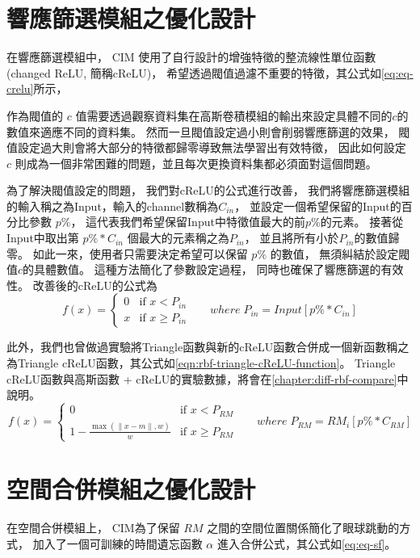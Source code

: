 \documentclass[class=NCU_thesis, crop=false]{standalone}
\begin{document}
\section{響應篩選模組之優化設計}
	在響應篩選模組中，
	CIM 使用了自行設計的增強特徵的整流線性單位函數(changed ReLU, 簡稱cReLU)，
	希望透過閥值過濾不重要的特徵，其公式如\cref{eq:eq-crelu}所示，
	
	作為閥值的 $c$ 值需要透過觀察資料集在高斯卷積模組的輸出來設定具體不同的$c$的數值來適應不同的資料集。
	然而一旦閥值設定過小則會削弱響應篩選的效果，
	閥值設定過大則會將大部分的特徵都歸零導致無法學習出有效特徵，
	因此如何設定 $c$ 則成為一個非常困難的問題，並且每次更換資料集都必須面對這個問題。

	為了解決閥值設定的問題，
	我們對cReLU的公式進行改善，
	我們將響應篩選模組的輸入稱之為Input，輸入的channel數稱為$C_{in}$，
	並設定一個希望保留的Input的百分比參數 $p\%$，
	這代表我們希望保留Input中特徵值最大的前$p\%$的元素。
	接著從Input中取出第 $p\% * C_{in}$  個最大的元素稱之為$P_{in}$，
	並且將所有小於$P_{in}$的數值歸零。
	如此一來，使用者只需要決定希望可以保留 $p\%$ 的數值，
	無須糾結於設定閥值$c$的具體數值。
	這種方法簡化了參數設定過程，
	同時也確保了響應篩選的有效性。
	改善後的cReLU的公式為\\
	\begin{equation}
	    \label{eq:eq-cReLUPercent}
	    f(x)= 
	    \begin{cases}
	        0 & \text{if  $x < P_{in}$ }\\
	        x & \text{if  $x \geq P_{in}$}
	    \end{cases} \quad where \; P_{in} = Input\left[ p\% * C_{in} \right]
	\end{equation}

	 \pagebreak
	此外，我們也曾做過實驗將Triangle函數與新的cReLU函數合併成一個新函數稱之為Triangle cReLU函數，其公式如\cref{eqn:rbf-triangle-cReLU-function}。
	Triangle cReLU函數與高斯函數 + cReLU的實驗數據，將會在\cref{chapter:diff-rbf-compare}中說明。
	\begin{equation}
      \label{eqn:rbf-triangle-cReLU-function}
      f(x)= 
      \begin{cases}
	        0 & \text{if  $x < P_{RM}$ }\\
	        1 - \frac{ \max \left( \| x-m \|, w \right)}{w} & \text{if  $x \geq P_{RM}$}
	   \end{cases} \quad where \; P_{RM} = RM_{i}\left[ p\% * C_{RM} \right]
  	\end{equation}

\section{空間合併模組之優化設計}
	在空間合併模組上，
	CIM為了保留 $RM$ 之間的空間位置關係簡化了眼球跳動的方式，
	加入了一個可訓練的時間遺忘函數 $\alpha$ 進入合併公式，其公式如\cref{eq:eq-sf}。
		
\end{document}
